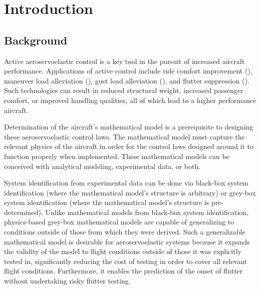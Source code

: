 \chapter{Introduction}
\label{ch:introduction}

%
%
%
%
%
%

\section{Background}

Active aeroservoelastic control is a key tool in the pursuit of increased aircraft performance. Applications of active control include ride comfort improvement (\cite{Jones1979}), maneuver load alleviation (\cite{Sensburg1982}), gust load alleviation (\cite{Nissim1976}), and flutter suppression (\cite{Livne2018}). Such technologies can result in reduced structural weight, increased passenger comfort, or improved handling qualities, all of which lead to a higher performance aircraft.

Determination of the aircraft's mathematical model is a prerequisite to designing these aeroservoelastic control laws. The mathematical model must capture the relevant physics of the aircraft in order for the control laws designed around it to function properly when implemented. These mathematical models can be conceived with analytical modeling, experimental data, or both.

System identification from experimental data can be done via black-box system identification (where the mathematical model's structure is arbitrary) or grey-box system identification (where the mathematical model's structure is pre-determined). Unlike mathematical models from black-box system identification, physics-based grey-box mathematical models are capable of generalizing to conditions outside of those from which they were derived. Such a generalizable mathematical model is desirable for aeroservoelastic systems because it expands the validity of the model to flight conditions outside of those it was explicitly tested in, significantly reducing the cost of testing in order to cover all relevant flight conditions. Furthermore, it enables the prediction of the onset of flutter without undertaking risky flutter testing.

